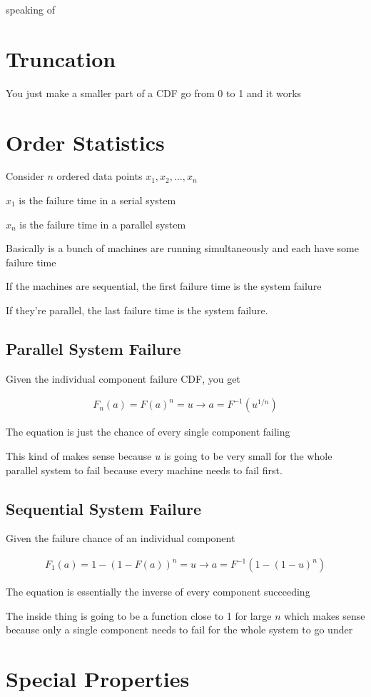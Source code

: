 \documentclass[fleqn]{report}
\newcommand{\equations} [1] {
\begin{gather*}
#1
\end{gather*}
}
\begin{document}
speaking of 

\section{Truncation}
You just make a smaller part of a CDF go from 0 to 1 and it works 

\section{Order Statistics}
Consider $n$ ordered data points $x_1, x_2, \ldots , x_n$ 

$x_1$ is the failure time in a serial system 

$x_n$ is the failure time in a parallel system 

Basically is a bunch of machines are running simultaneously and each have 
some failure time 

If the machines are sequential, the first failure time is the system failure 

If they're parallel, the last failure time is the system failure. 

\subsection{Parallel System Failure}
Given the individual component failure CDF, you get 
\equations{
    F_n(a) = F(a)^{n} = u 
    \rightarrow 
    a = F^{-1}(u^{1/n})
}
The equation is just the chance of every single component failing 

This kind of makes sense because $u$ is going to be very small for the whole 
parallel system to fail because every machine needs to fail first. 

\subsection{Sequential System Failure}
Given the failure chance of an individual component 
\equations{
    F_1(a)
    =
    1 - (1 - F(a))^n = u
    \rightarrow 
    a 
    =
    F^{-1}
    (1 - (1 - u)^n)
}
The equation is essentially the inverse of every component succeeding 

The inside thing is going to be a function close to 1 for large $n$ which 
makes sense because only a single component needs to fail for the whole 
system to go under 


\section{Special Properties}
\end{document}
